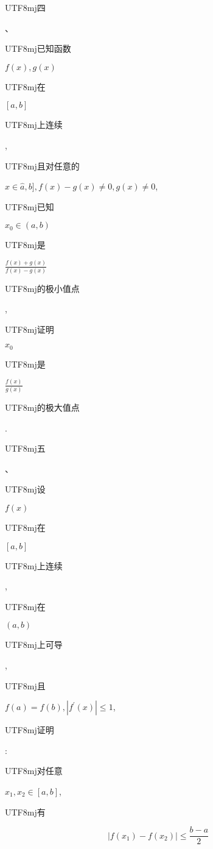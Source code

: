\documentclass[10pt]{article}
\begin{document}
\begin{CJK}{UTF8}{mj}四\end{CJK}、\begin{CJK}{UTF8}{mj}已知函数\end{CJK} $f(x), g(x)$ \begin{CJK}{UTF8}{mj}在\end{CJK} $[a, b]$ \begin{CJK}{UTF8}{mj}上连续\end{CJK}, \begin{CJK}{UTF8}{mj}且对任意的\end{CJK} $x \in \widehat{a}, b], f(x)-g(x) \neq 0, g(x) \neq 0$, \begin{CJK}{UTF8}{mj}已知\end{CJK} $x_{0} \in(a, b)$ \begin{CJK}{UTF8}{mj}是\end{CJK} $\frac{f(x)+g(x)}{f(x)-g(x)}$ \begin{CJK}{UTF8}{mj}的极小值点\end{CJK}, \begin{CJK}{UTF8}{mj}证明\end{CJK} $x_{0}$ \begin{CJK}{UTF8}{mj}是\end{CJK} $\frac{f(x)}{g(x)}$ \begin{CJK}{UTF8}{mj}的极大值点\end{CJK}.

\begin{CJK}{UTF8}{mj}五\end{CJK}、\begin{CJK}{UTF8}{mj}设\end{CJK} $f(x)$ \begin{CJK}{UTF8}{mj}在\end{CJK} $[a, b]$ \begin{CJK}{UTF8}{mj}上连续\end{CJK}, \begin{CJK}{UTF8}{mj}在\end{CJK} $(a, b)$ \begin{CJK}{UTF8}{mj}上可导\end{CJK}, \begin{CJK}{UTF8}{mj}且\end{CJK} $f(a)=f(b),\left|f^{\prime}(x)\right| \leq 1$, \begin{CJK}{UTF8}{mj}证明\end{CJK}: \begin{CJK}{UTF8}{mj}对任意\end{CJK} $x_{1}, x_{2} \in[a, b]$, \begin{CJK}{UTF8}{mj}有\end{CJK}
$$
\left|f\left(x_{1}\right)-f\left(x_{2}\right)\right| \leq \frac{b-a}{2}
$$
\end{document}
